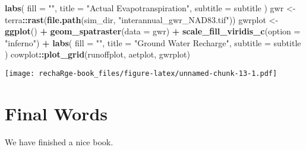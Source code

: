 \documentclass[
]{book}
\newenvironment{Shaded}{\begin{snugshade}}{\end{snugshade}}
\newcommand{\AttributeTok}[1]{\textcolor[rgb]{0.13,0.29,0.53}{#1}}
\newcommand{\FunctionTok}[1]{\textcolor[rgb]{0.13,0.29,0.53}{\textbf{#1}}}
\newcommand{\NormalTok}[1]{#1}
\newcommand{\OtherTok}[1]{\textcolor[rgb]{0.56,0.35,0.01}{#1}}
\newcommand{\SpecialCharTok}[1]{\textcolor[rgb]{0.81,0.36,0.00}{\textbf{#1}}}
\newcommand{\StringTok}[1]{\textcolor[rgb]{0.31,0.60,0.02}{#1}}
\begin{document}
\begin{Shaded}
\begin{Highlighting}[]
  \FunctionTok{labs}\NormalTok{(}
    \AttributeTok{fill =} \StringTok{""}\NormalTok{,}
    \AttributeTok{title =} \StringTok{"Actual Evapotranspiration"}\NormalTok{,}
    \AttributeTok{subtitle =}\NormalTok{ subtitle}
\NormalTok{  )}
\NormalTok{gwr }\OtherTok{\textless{}{-}}\NormalTok{ terra}\SpecialCharTok{::}\FunctionTok{rast}\NormalTok{(}\FunctionTok{file.path}\NormalTok{(sim\_dir, }\StringTok{"interannual\_gwr\_NAD83.tif"}\NormalTok{))}
\NormalTok{gwrplot }\OtherTok{\textless{}{-}} \FunctionTok{ggplot}\NormalTok{() }\SpecialCharTok{+}
  \FunctionTok{geom\_spatraster}\NormalTok{(}\AttributeTok{data =}\NormalTok{ gwr) }\SpecialCharTok{+}
  \FunctionTok{scale\_fill\_viridis\_c}\NormalTok{(}\AttributeTok{option =} \StringTok{"inferno"}\NormalTok{) }\SpecialCharTok{+}
  \FunctionTok{labs}\NormalTok{(}
    \AttributeTok{fill =} \StringTok{""}\NormalTok{,}
    \AttributeTok{title =} \StringTok{"Ground Water Recharge"}\NormalTok{,}
    \AttributeTok{subtitle =}\NormalTok{ subtitle}
\NormalTok{  )}
\NormalTok{cowplot}\SpecialCharTok{::}\FunctionTok{plot\_grid}\NormalTok{(runoffplot, aetplot, gwrplot)}
\end{Highlighting}
\end{Shaded}

\texttt{[image: rechaRge-book\_files/figure-latex/unnamed-chunk-13-1.pdf]}

\hypertarget{final-words}{%
\chapter{Final Words}\label{final-words}}

We have finished a nice book.

  
\end{document}
